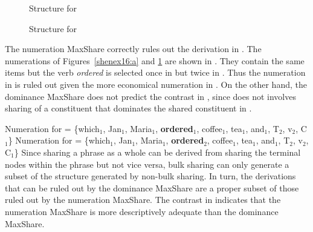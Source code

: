 \documentclass[output=paper]{langscibook}
\begin{document}
\begin{figure}
\footnotesize
\captionsetup{margin=.05\linewidth}
\begin{floatrow}
{\caption{\label{shenex16:a}Structure for }}
{\caption{\label{shenex16:b}Structure for }}
\end{floatrow}
\end{figure}

The numeration MaxShare correctly rules out the derivation in . The numerations of Figures~\ref{shenex16:a} and \ref{shenex16:b} are shown in . They contain the same items but the verb \textit{ordered} is selected once in  but twice in . Thus the numeration in  is ruled out given the more economical numeration in .
On the other hand, the dominance MaxShare does not predict the contrast in , since  does not involves sharing of a constituent that dominates the shared constituent in .

\ea 
	\label{shennum}
	\ea 
		\label{shennum:a}
		Numeration for  = \{which$_1$, Jan$_1$, Maria$_1$, \textbf{ordered$_1$}, coffee$_1$, tea$_1$, and$_1$, T$_2$, v$_2$, C$_1$\} 
	\ex 
		\label{shennum:b}
		Numeration for  = \{which$_1$, Jan$_1$, Maria$_1$, \textbf{ordered$_2$}, coffee$_1$, tea$_1$, and$_1$, T$_2$, v$_2$, C$_1$\} 
	\z 
\z 
Since sharing a phrase as a whole can be derived from sharing the terminal nodes within the phrase but not vice versa, bulk sharing can only generate a subset of the structure generated by non-bulk sharing. In turn, the derivations that can be ruled out by the dominance MaxShare are a proper subset of those ruled out by the numeration MaxShare. The contrast in  indicates that the numeration MaxShare is more descriptively adequate than the dominance MaxShare. 
\end{document}
